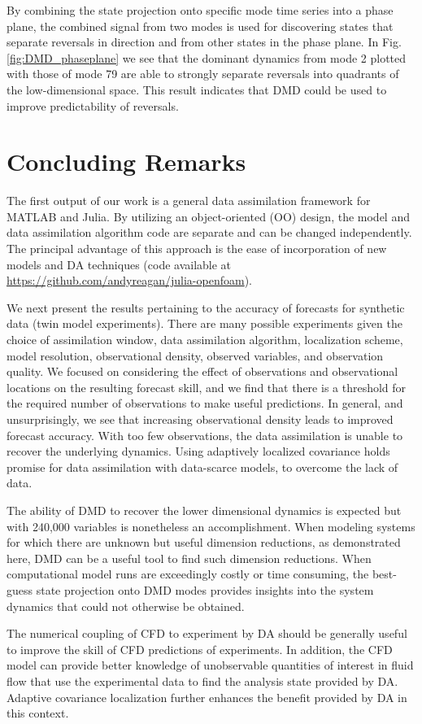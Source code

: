 By combining the state projection onto specific mode time series into a phase plane, the combined signal from two modes is used for discovering states that separate reversals in direction and from other states in the phase plane.
In Fig. \ref{fig:DMD_phaseplane} we see that the dominant dynamics from mode 2 plotted with those of mode 79 are able to strongly separate reversals into quadrants of the low-dimensional space.
This result indicates that DMD could be used to improve predictability of reversals.

\section*{Concluding Remarks}

The first output of our work is a general data assimilation framework for MATLAB and Julia.
By utilizing an object-oriented (OO) design, the model and data assimilation algorithm code are separate and can be changed independently.
The principal advantage of this approach is the ease of incorporation of new models and DA techniques (code available at \url{https://github.com/andyreagan/julia-openfoam}).

We next present the results pertaining to the accuracy of forecasts for synthetic data (twin model experiments).
There are many possible experiments given the choice of assimilation window, data assimilation algorithm, localization scheme, model resolution, observational density, observed variables, and observation quality.
We focused on considering the effect of observations and observational locations on the resulting forecast skill, and we find that there is a threshold for the required number of observations to make useful predictions.
In general, and unsurprisingly, we see that increasing observational density leads to improved forecast accuracy.
With too few observations, the data assimilation is unable to recover the underlying dynamics.
Using adaptively localized covariance holds promise for data assimilation with data-scarce models, to overcome the lack of data.

The ability of DMD to recover the lower dimensional dynamics is expected but with 240,000 variables is nonetheless an accomplishment.
When modeling systems for which there are unknown but useful dimension reductions, as demonstrated here, DMD can be a useful tool to find such dimension reductions.
When computational model runs are exceedingly costly or time consuming, the best-guess state projection onto DMD modes provides insights into the system dynamics that could not otherwise be obtained.

The numerical coupling of CFD to experiment by DA should be generally useful to improve the skill of CFD predictions of experiments.
In addition, the CFD model can provide better knowledge of unobservable quantities of interest in fluid flow that use the experimental data to find the analysis state provided by DA.
Adaptive covariance localization further enhances the benefit provided by DA in this context.


